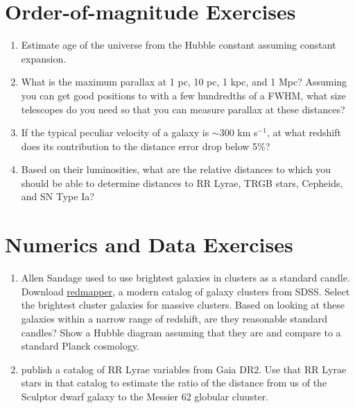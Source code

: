 \section{Order-of-magnitude Exercises}

\begin{enumerate} 
\item Estimate age of the universe from the Hubble constant assuming
    constant expansion.
\item What is the maximum parallax at 1 pc, 10 pc, 1 kpc, and 1 Mpc?
    Assuming you can get good positions to with a few hundredths of a
    FWHM, what size telescopes do you need so that you can measure
    parallax at these distances?
\item If the typical peculiar velocity of a galaxy is $\sim 300$ km
    s$^{-1}$, at what redshift does its contribution to the distance
   error drop below 5\%?
\item Based on their luminosities, what are the relative distances to
   which you should be able to determine distances to RR Lyrae,
   TRGB stars, Cepheids, and SN Type Ia?
\end{enumerate} 

\section{Numerics and Data Exercises}

\begin{enumerate}
\item Allen Sandage used to use brightest galaxies in clusters as a
   standard
   candle. Download \href{http://risa.stanford.edu/redmapper/}{redmapper},
   a modern catalog of galaxy clusters from SDSS. Select the brightest
   cluster galaxies for massive clusters. Based on looking at these
   galaxies within a narrow range of redshift, are they reasonable
   standard candles? Show a Hubble diagram assuming that they are and
   compare to a standard Planck cosmology.
\item \citet{clementini18a} publish a catalog of RR Lyrae variables
   from Gaia DR2. Use that RR Lyrae stars in that catalog to estimate
   the ratio of the distance from us of the Sculptor dwarf galaxy to
   the Messier 62 globular cluuster.
\end{enumerate}


  
